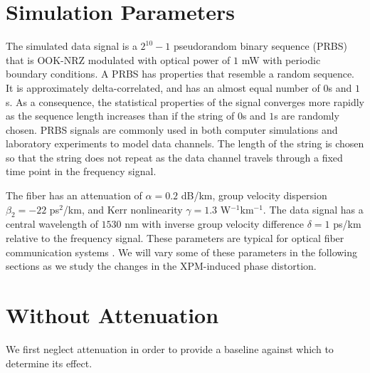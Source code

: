 \section{Simulation Parameters}

The simulated data signal is a $2^{10}-1$ pseudorandom binary sequence (PRBS) \cite{PRBS} that is OOK-NRZ modulated with optical power of $1$ mW with periodic boundary conditions. A PRBS has properties that resemble a random sequence. It is approximately delta-correlated, and has an almost equal number of $0$s and $1$s. As a consequence, the statistical properties of the signal converges more rapidly as the sequence length increases than if the string of $0$s and $1$s are randomly chosen. PRBS signals are commonly used in both computer simulations and laboratory experiments to model data channels. The length of the string is chosen so that the string does not repeat as the data channel travels through a fixed time point in the frequency signal.

The fiber has an attenuation of $\alpha = 0.2$ dB/km, group velocity dispersion $\beta_2 = -22$ ps$^2$/km, and Kerr nonlinearity $\gamma = 1.3$ W$^{-1}$km$^{-1}$. The data signal has a central wavelength of $1530$ nm with inverse group velocity difference $\delta = 1$ ps/km relative to the frequency signal. These parameters are typical for optical fiber communication systems \cite{agrawal2012fiber,Agrawal2013}. We will vary some of these parameters in the following sections as we study the changes in the XPM-induced phase distortion.


\section{Without Attenuation}

We first neglect attenuation in order to provide a baseline against which to determine its effect.

